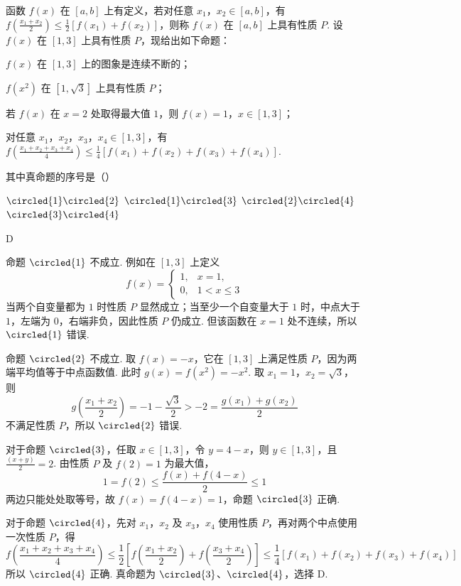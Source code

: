 \begin{problem}
函数 \(f(x)\) 在 \([a,b]\) 上有定义，若对任意 \(x_{1}\)，\(x_{2} \in [a,b]\)，有 \(f\left(\frac{x_{1} + x_{2}}{2}\right) \leqslant \frac{1}{2}[f(x_{1}) + f(x_{2})]\)，则称 \(f(x)\) 在 \([a,b]\) 上具有性质 \(P\). 设 \(f(x)\) 在 \([1,3]\) 上具有性质 \(P\)，现给出如下命题：

\begin{circlelist}
\item \(f(x)\) 在 \([1,3]\) 上的图象是连续不断的；
\item \(f(x^{2})\) 在 \([1,\sqrt{3}]\) 上具有性质 \(P\)；
\item 若 \(f(x)\) 在 \(x = 2\) 处取得最大值 \(1\)，则 \(f(x) = 1\)，\(x \in [1,3]\)；
\item 对任意 \(x_{1}\)，\(x_{2}\)，\(x_{3}\)，\(x_{4} \in [1,3]\)，有 \(f\left(\frac{x_{1} + x_{2} + x_{3} + x_{4}}{4}\right) \leqslant \frac{1}{4}[f(x_{1}) + f(x_{2}) + f(x_{3}) + f(x_{4})]\).
\end{circlelist}

其中真命题的序号是（\quad）

\choices
    {\(\circled{1}\circled{2}\)}
    {\(\circled{1}\circled{3}\)}
    {\(\circled{2}\circled{4}\)}
    {\(\circled{3}\circled{4}\)}
\end{problem}

\begin{answer}
D
\end{answer}

\begin{solution}
命题 \(\circled{1}\) 不成立. 例如在 \([1,3]\) 上定义
\[
f(x)=\begin{cases}
1,&x=1,\\
0,&1<x\leqslant3
\end{cases}
\]
当两个自变量都为 \(1\) 时性质 \(P\) 显然成立；当至少一个自变量大于 \(1\) 时，中点大于 \(1\)，左端为 \(0\)，右端非负，因此性质 \(P\) 仍成立. 但该函数在 \(x=1\) 处不连续，所以 \(\circled{1}\) 错误.

命题 \(\circled{2}\) 不成立. 取 \(f(x)=-x\)，它在 \([1,3]\) 上满足性质 \(P\)，因为两端平均值等于中点函数值. 此时 \(g(x)=f(x^{2})=-x^{2}\). 取 \(x_{1}=1\)，\(x_{2}=\sqrt3\)，则
\[
g\left(\frac{x_{1}+x_{2}}{2}\right)=-1-\frac{\sqrt3}{2}>-2=\frac{g(x_{1})+g(x_{2})}{2}
\]
不满足性质 \(P\)，所以 \(\circled{2}\) 错误.

对于命题 \(\circled{3}\)，任取 \(x\in[1,3]\)，令 \(y=4-x\)，则 \(y\in[1,3]\)，且 \(\frac{(x+y)}{2}=2\). 由性质 \(P\) 及 \(f(2)=1\) 为最大值，
\[
1=f(2)\leqslant\frac{f(x)+f(4-x)}{2}\leqslant1
\]
两边只能处处取等号，故 \(f(x)=f(4-x)=1\)，命题 \(\circled{3}\) 正确.

对于命题 \(\circled{4}\)，先对 \(x_{1}\)，\(x_{2}\) 及 \(x_{3}\)，\(x_{4}\) 使用性质 \(P\)，再对两个中点使用一次性质 \(P\)，得
\[
f\left(\frac{x_{1}+x_{2}+x_{3}+x_{4}}{4}\right)
\leqslant\frac12\left[f\left(\frac{x_{1}+x_{2}}2\right)+f\left(\frac{x_{3}+x_{4}}2\right)\right]
\leqslant\frac14\left[f(x_{1})+f(x_{2})+f(x_{3})+f(x_{4})\right]
\]
所以 \(\circled{4}\) 正确. 真命题为 \(\circled{3}\)、\(\circled{4}\)，选择 D.
\end{solution}

